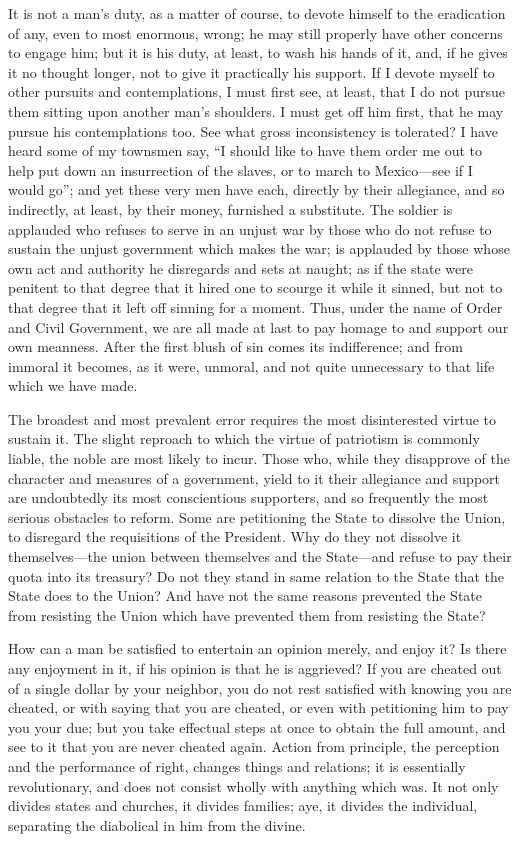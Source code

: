 \documentclass[letterpaper,12pt]{article}
\begin{document}
It is not a man's duty, as a matter of course, to devote himself to the
eradication of any, even to most enormous, wrong; he may still properly have
other concerns to engage him; but it is his duty, at least, to wash his hands of
it, and, if he gives it no thought longer, not to give it practically his
support. If I devote myself to other pursuits and contemplations, I must first
see, at least, that I do not pursue them sitting upon another man's shoulders.
I must get off him first, that he may pursue his contemplations too. See what
gross inconsistency is tolerated?  I have heard some of my townsmen say,
\enquote{I should like to have them order me out to help put down an
    insurrection of the slaves, or to march to Mexico---see if I would go}; and
yet these very men have each, directly by their allegiance, and so indirectly,
at least, by their money, furnished a substitute. The soldier is applauded who
refuses to serve in an unjust war by those who do not refuse to sustain the
unjust government which makes the war; is applauded by those whose own act and
authority he disregards and sets at naught; as if the state were penitent to
that degree that it hired one to scourge it while it sinned, but not to that
degree that it left off sinning for a moment. Thus, under the name of Order and
Civil Government, we are all made at last to pay homage to and support our own
meanness. After the first blush of sin comes its indifference; and from immoral
it becomes, as it were, unmoral, and not quite unnecessary to that life which we
have made.

The broadest and most prevalent error requires the most disinterested virtue to
sustain it. The slight reproach to which the virtue of patriotism is commonly
liable, the noble are most likely to incur. Those who, while they disapprove of
the character and measures of a government, yield to it their allegiance and
support are undoubtedly its most conscientious supporters, and so frequently the
most serious obstacles to reform. Some are petitioning the State to dissolve the
Union, to disregard the requisitions of the President. Why do they not dissolve
it themselves---the union between themselves and the State---and refuse to pay
their quota into its treasury? Do not they stand in same relation to the State
that the State does to the Union? And have not the same reasons prevented the
State from resisting the Union which have prevented them from resisting the
State?

How can a man be satisfied to entertain an opinion merely, and enjoy it? Is
there any enjoyment in it, if his opinion is that he is aggrieved? If you are
cheated out of a single dollar by your neighbor, you do not rest satisfied with
knowing you are cheated, or with saying that you are cheated, or even with
petitioning him to pay you your due; but you take effectual steps at once to
obtain the full amount, and see to it that you are never cheated again. Action
from principle, the perception and the performance of right, changes things and
relations; it is essentially revolutionary, and does not consist wholly with
anything which was. It not only divides states and churches, it divides
families; aye, it divides the individual, separating the diabolical in him from
the divine.
\end{document}
